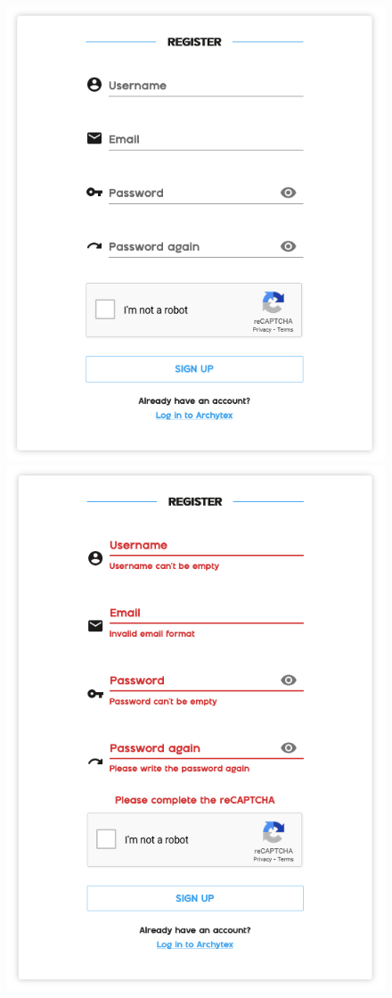 \begin{figure}[h]
  \centering
  \includegraphics[scale=.5]{parts/user-documentation/account/images/register.png}
  \includegraphics[scale=.5]{parts/user-documentation/account/images/register-errors.png}

\end{figure}

